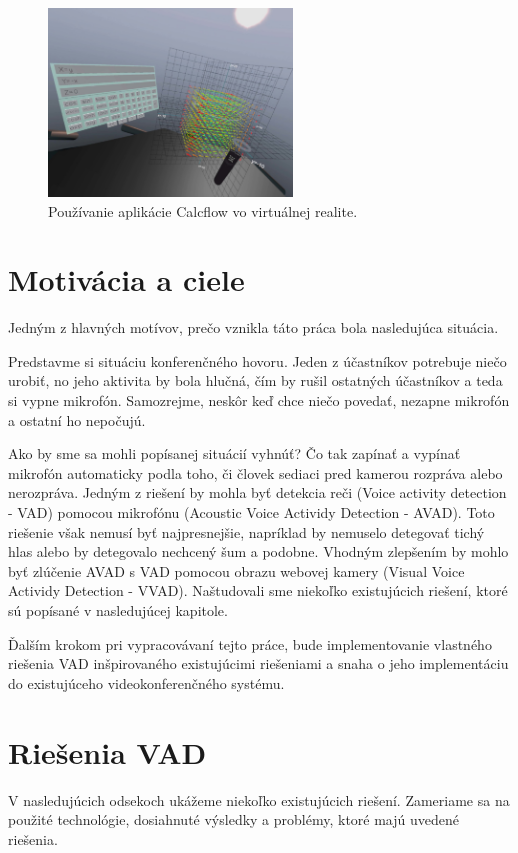 \begin{figure}[H]
	\begin{center}
		\includegraphics[height=5cm]{pics/calcFlow.jpg}
		\caption{Používanie aplikácie Calcflow vo virtuálnej realite. 
		 \cite{calcFlow}}
		\label{pic-calcFlow}
	\end{center}
\end{figure}

\chapter{Motivácia a ciele}
Jedným z hlavných motívov, prečo vznikla táto práca bola nasledujúca situácia. 

Predstavme si situáciu konferenčného hovoru. 
Jeden z účastníkov potrebuje niečo urobiť, no jeho aktivita by bola hlučná, čím by rušil ostatných účastníkov a teda si vypne mikrofón. 
Samozrejme, neskôr keď chce niečo povedať, nezapne mikrofón a ostatní ho nepočujú.

Ako by sme sa mohli popísanej situácií vyhnúť? 
Čo tak zapínať a vypínať mikrofón automaticky podla toho, či človek sediaci pred kamerou rozpráva alebo nerozpráva.
Jedným z riešení by mohla byť detekcia reči (Voice activity detection - VAD) pomocou mikrofónu (Acoustic Voice Actividy Detection - AVAD).
Toto riešenie však nemusí byť najpresnejšie, napríklad by nemuselo detegovať tichý hlas alebo by detegovalo nechcený šum a podobne.
Vhodným zlepšením by mohlo byť zlúčenie AVAD s VAD pomocou obrazu webovej kamery (Visual Voice Actividy Detection - VVAD).
Naštudovali sme niekoľko existujúcich riešení, ktoré sú popísané v nasledujúcej kapitole.

Ďalším krokom pri vypracovávaní tejto práce, bude implementovanie vlastného riešenia VAD inšpirovaného existujúcimi riešeniami a snaha o jeho implementáciu do existujúceho videokonferenčného systému. 

\chapter{Riešenia VAD}
V nasledujúcich odsekoch ukážeme niekoľko existujúcich riešení.
Zameriame sa na použité technológie, dosiahnuté výsledky a problémy, ktoré majú uvedené riešenia.\\

